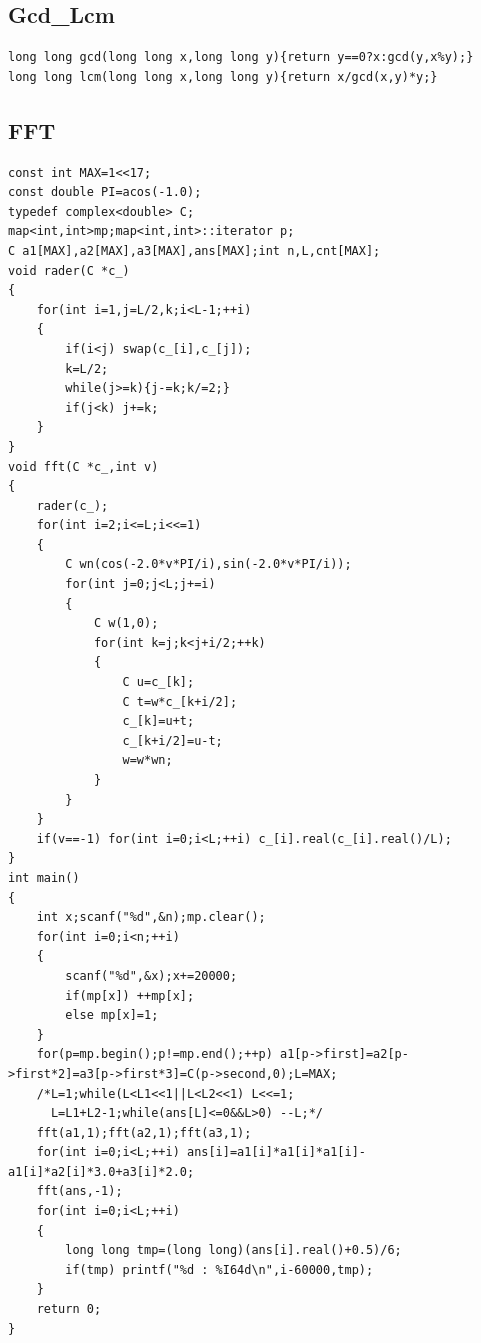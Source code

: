 \documentclass[twoside]{article}
\begin{document}
\subsection{Gcd_Lcm}
\begin{lstlisting}
long long gcd(long long x,long long y){return y==0?x:gcd(y,x%y);}
long long lcm(long long x,long long y){return x/gcd(x,y)*y;}
\end{lstlisting}
\subsection{FFT}
\begin{lstlisting}
const int MAX=1<<17;
const double PI=acos(-1.0);
typedef complex<double> C;
map<int,int>mp;map<int,int>::iterator p;
C a1[MAX],a2[MAX],a3[MAX],ans[MAX];int n,L,cnt[MAX];
void rader(C *c_)
{
    for(int i=1,j=L/2,k;i<L-1;++i)
    {
        if(i<j) swap(c_[i],c_[j]);
        k=L/2;
        while(j>=k){j-=k;k/=2;}
        if(j<k) j+=k;
    }
}
void fft(C *c_,int v)
{
    rader(c_);
    for(int i=2;i<=L;i<<=1)
    {
        C wn(cos(-2.0*v*PI/i),sin(-2.0*v*PI/i));
        for(int j=0;j<L;j+=i)
        {
            C w(1,0);
            for(int k=j;k<j+i/2;++k)
            {
                C u=c_[k];
                C t=w*c_[k+i/2];
                c_[k]=u+t;
                c_[k+i/2]=u-t;
                w=w*wn;
            }
        }
    }
    if(v==-1) for(int i=0;i<L;++i) c_[i].real(c_[i].real()/L);
}
int main()
{
    int x;scanf("%d",&n);mp.clear();
    for(int i=0;i<n;++i)
    {
        scanf("%d",&x);x+=20000;
        if(mp[x]) ++mp[x];
        else mp[x]=1;
    }
    for(p=mp.begin();p!=mp.end();++p) a1[p->first]=a2[p->first*2]=a3[p->first*3]=C(p->second,0);L=MAX;
    /*L=1;while(L<L1<<1||L<L2<<1) L<<=1;
      L=L1+L2-1;while(ans[L]<=0&&L>0) --L;*/
    fft(a1,1);fft(a2,1);fft(a3,1);
    for(int i=0;i<L;++i) ans[i]=a1[i]*a1[i]*a1[i]-a1[i]*a2[i]*3.0+a3[i]*2.0;
    fft(ans,-1);
    for(int i=0;i<L;++i)
    {
        long long tmp=(long long)(ans[i].real()+0.5)/6;
        if(tmp) printf("%d : %I64d\n",i-60000,tmp);
    }
    return 0;
}
\end{lstlisting}
\end{document}
